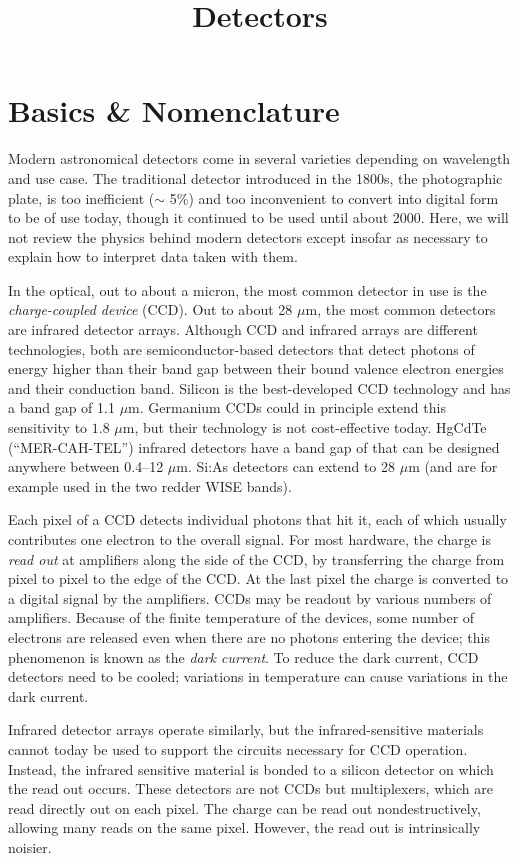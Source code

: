 \title{\bf Detectors}

\section{Basics \& Nomenclature}

Modern astronomical detectors come in several varieties depending on
wavelength and use case. The traditional detector introduced in the
1800s, the photographic plate, is too inefficient ($\sim$ 5\%) and too
inconvenient to convert into digital form to be of use today, though
it continued to be used until about 2000. Here, we will not review the
physics behind modern detectors except insofar as necessary to explain
how to interpret data taken with them.

In the optical, out to about a micron, the most common detector in use
is the {\it charge-coupled device} (CCD). Out to about 28 $\mu$m, the
most common detectors are infrared detector arrays. Although CCD and
infrared arrays are different technologies, both are
semiconductor-based detectors that detect photons of energy higher
than their band gap between their bound valence electron energies and
their conduction band. Silicon is the best-developed CCD technology
and has a band gap of 1.1 $\mu$m.  Germanium CCDs could in principle
extend this sensitivity to $1.8$ $\mu$m, but their technology is not
cost-effective today. HgCdTe (``MER-CAH-TEL'') infrared detectors have
a band gap of that can be designed anywhere between 0.4--12
$\mu$m. Si:As detectors can extend to 28 $\mu$m (and are for example
used in the two redder WISE bands).

Each pixel of a CCD detects individual photons that hit it, each of
which usually contributes one electron to the overall signal. For most
hardware, the charge is {\it read out} at amplifiers along the side of
the CCD, by transferring the charge from pixel to pixel to the edge of
the CCD. At the last pixel the charge is converted to a digital signal
by the amplifiers. CCDs may be readout by various numbers of
amplifiers. Because of the finite temperature of the devices, some
number of electrons are released even when there are no photons
entering the device; this phenomenon is known as the {\it dark
current}. To reduce the dark current, CCD detectors need to be cooled;
variations in temperature can cause variations in the dark current.

Infrared detector arrays operate similarly, but the infrared-sensitive
materials cannot today be used to support the circuits necessary for
CCD operation. Instead, the infrared sensitive material is bonded to a
silicon detector on which the read out occurs. These detectors are not
CCDs but multiplexers, which are read directly out on each pixel. The
charge can be read out nondestructively, allowing many reads on the
same pixel. However, the read out is intrinsically noisier.

